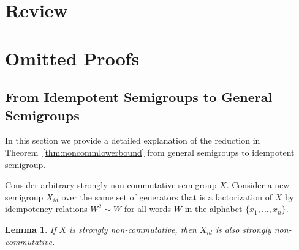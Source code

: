 \documentclass[11pt,letterpaper]{article}
\newtheorem{lemma}{Lemma}
\begin{document}
\section{Review}





\section{Omitted Proofs}
%

\subsection{From Idempotent Semigroups to General Semigroups}\label{sec:noncommutative_extension}

In this section we provide a detailed explanation of the reduction in Theorem~\ref{thm:noncommlowerbound} from general semigroups to idempotent semigroup.

Consider arbitrary strongly non-commutative semigroup $X$. Consider a new semigroup $X_{id}$ over the same set of generators that is a factorization of $X$ by idempotency relations $W^2\sim W$ for all words $W$ in the alphabet $\{x_1,\ldots, x_n\}$.

\begin{lemma} \label{lem:idempotisation}
If $X$ is strongly non-commutative, then $X_{id}$ is also strongly non-commutative.
\end{lemma}
\end{document}
